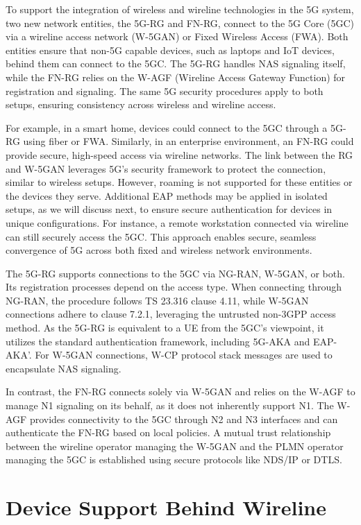 To support the integration of wireless and wireline technologies in the 5G system, two new network entities, the 5G-RG and FN-RG, connect to the 5G Core (5GC) via a wireline access network (W-5GAN) or Fixed Wireless Access (FWA). Both entities ensure that non-5G capable devices, such as laptops and IoT devices, behind them can connect to the 5GC. The 5G-RG handles NAS signaling itself, while the FN-RG relies on the W-AGF (Wireline Access Gateway Function) for registration and signaling. The same 5G security procedures apply to both setups, ensuring consistency across wireless and wireline access.

For example, in a smart home, devices could connect to the 5GC through a 5G-RG using fiber or FWA. Similarly, in an enterprise environment, an FN-RG could provide secure, high-speed access via wireline networks. The link between the RG and W-5GAN leverages 5G’s security framework to protect the connection, similar to wireless setups. However, roaming is not supported for these entities or the devices they serve. Additional EAP methods may be applied in isolated setups, as we will discuss next, to ensure secure authentication for devices in unique configurations. For instance, a remote workstation connected via wireline can still securely access the 5GC. This approach enables secure, seamless convergence of 5G across both fixed and wireless network environments.

The 5G-RG supports connections to the 5GC via NG-RAN, W-5GAN, or both. Its registration processes depend on the access type. When connecting through NG-RAN, the procedure follows TS 23.316 clause 4.11, while W-5GAN connections adhere to clause 7.2.1, leveraging the untrusted non-3GPP access method. As the 5G-RG is equivalent to a UE from the 5GC’s viewpoint, it utilizes the standard authentication framework, including 5G-AKA and EAP-AKA’. For W-5GAN connections, W-CP protocol stack messages are used to encapsulate NAS signaling.

In contrast, the FN-RG connects solely via W-5GAN and relies on the W-AGF to manage N1 signaling on its behalf, as it does not inherently support N1. The W-AGF provides connectivity to the 5GC through N2 and N3 interfaces and can authenticate the FN-RG based on local policies. A mutual trust relationship between the wireline operator managing the W-5GAN and the PLMN operator managing the 5GC is established using secure protocols like NDS/IP or DTLS.

\section{Device Support Behind Wireline}

